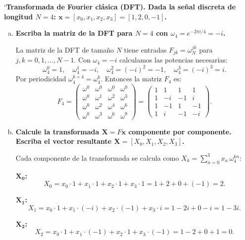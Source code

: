 `{\bfseries Transformada de Fourier clásica (DFT). Dada la señal discreta de longitud $N = 4$:
$\mathbf{x} = [x_0, x_1, x_2, x_3] = [1, 2, 0, -1]$.}

\begin{enumerate}[a)]
	\item {\bfseries Escriba la matriz de la DFT para $N = 4$ con $\omega_4 = e^{-2\pi i/4} = -i$.}

	      La matriz de la DFT de tamaño $N$ tiene entradas $F_{jk} = \omega_N^{jk}$ para $j, k = 0, 1, \ldots, N-1$. Con $\omega_4 = -i$ calculamos las potencias necesarias:
	      \[
		      \omega_4^0 = 1, \quad \omega_4^1 = -i, \quad \omega_4^2 = (-i)^2 = -1, \quad \omega_4^3 = (-i)^3 = i.
	      \]
	      Por periodicidad $\omega_4^{k+4} = \omega_4^k$. Entonces la matriz $F_4$ es:
	      \[
		      F_4 = \begin{pmatrix}
			      \omega^0 & \omega^0 & \omega^0 & \omega^0 \\
			      \omega^0 & \omega^1 & \omega^2 & \omega^3 \\
			      \omega^0 & \omega^2 & \omega^4 & \omega^6 \\
			      \omega^0 & \omega^3 & \omega^6 & \omega^9
		      \end{pmatrix}
		      =
		      \begin{pmatrix}
			      1 & 1  & 1  & 1  \\
			      1 & -i & -1 & i  \\
			      1 & -1 & 1  & -1 \\
			      1 & i  & -1 & -i
		      \end{pmatrix}.
	      \]

	\item {\bfseries Calcule la transformada $\mathbf{X} = F\mathbf{x}$ componente por componente. Escriba el vector resultante $\mathbf{X} = [X_0, X_1, X_2, X_3]$.}

	      Cada componente de la transformada se calcula como $X_k = \sum_{n=0}^{3} x_n \, \omega_4^{kn}$:

	      \textbf{$\boldsymbol{X_0}$:}
	      \[
		      X_0 = x_0 \cdot 1 + x_1 \cdot 1 + x_2 \cdot 1 + x_3 \cdot 1 = 1 + 2 + 0 + (-1) = 2.
	      \]

	      \textbf{$\boldsymbol{X_1}$:}
	      \[
		      X_1 = x_0 \cdot 1 + x_1 \cdot (-i) + x_2 \cdot (-1) + x_3 \cdot i = 1 - 2i + 0 - i = 1 - 3i.
	      \]

	      \textbf{$\boldsymbol{X_2}$:}
	      \[
		      X_2 = x_0 \cdot 1 + x_1 \cdot (-1) + x_2 \cdot 1 + x_3 \cdot (-1) = 1 - 2 + 0 + 1 = 0.
	      \]


\end{enumerate}
